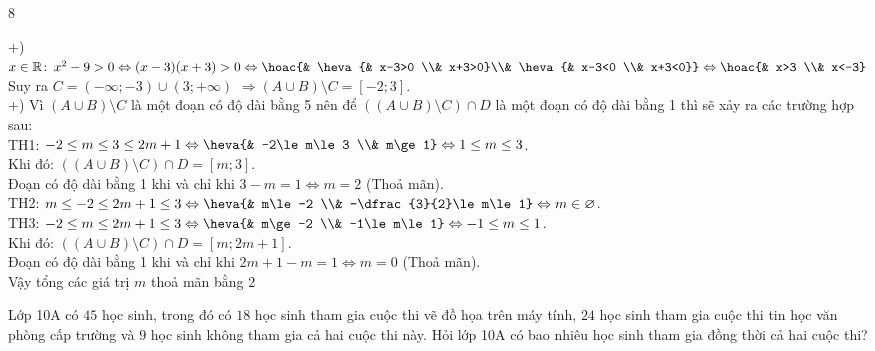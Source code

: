 \begin{indapan}{8}
\begin{bt}
{		+) $x\in \mathbb{R}\colon \,x^2-9>0\Leftrightarrow (x-3)(x+3)>0\Leftrightarrow \hoac{& \heva{& x-3>0 \\& x+3>0}\\& \heva{& x-3<0 \\& x+3<0}} \Leftrightarrow \hoac{& x>3 \\& x<-3}$\\
		Suy ra $C=\left(-\infty ;-3\right)\cup \left(3;+\infty\right)$ $\Rightarrow \left(A\cup B\right)\setminus C=\left[-2;3\right]$.\\
		+) Vì $\left(A\cup B\right)\setminus C$ là một đoạn có độ dài bằng 5 nên để $\left(\left(A\cup B\right)\setminus C\right)\cap D$ là một đoạn có độ dài bằng 1 thì sẽ xảy ra các trường hợp sau:\\
		TH1: $-2\le m\le 3\le 2m+1\Leftrightarrow \heva{& -2\le m\le 3 \\& m\ge 1}\Leftrightarrow 1\le m\le 3$.\\
		Khi đó: $\left(\left(A\cup B\right)\setminus C\right)\cap D=\left[m;3\right]$.\\
		Đoạn có độ dài bằng 1 khi và chỉ khi $3-m=1\Leftrightarrow m=2$ (Thoả mãn).\\
		TH2: $m\le -2\le 2m+1\le 3\Leftrightarrow \heva{& m\le -2 \\& -\dfrac{3}{2}\le m\le 1}\Leftrightarrow m\in \varnothing $.\\
		TH3: $-2\le m\le 2m+1\le 3\Leftrightarrow \heva{& m\ge -2 \\& -1\le m\le 1}\Leftrightarrow -1\le m\le 1$.\\
		Khi đó: $\left(\left(A\cup B\right)\setminus C\right)\cap D=\left[m;2m+1\right]$.\\
		Đoạn có độ dài bằng 1 khi và chỉ khi $2m+1-m=1\Leftrightarrow m=0$ (Thoả mãn).\\
		Vậy tổng các giá trị $m$ thoả mãn bằng 2
	}
\end{bt}
% 
\begin{bt}%
Lớp 10A có $45$ học sinh, trong đó có $18$ học sinh tham gia cuộc thi vẽ đồ họa trên máy tính, $24$ học sinh tham gia cuộc thi tin học văn phòng cấp trường và $9$ học sinh không tham gia cả hai cuộc thi này. Hỏi lớp 10A có bao nhiêu học sinh tham gia đồng thời cả hai cuộc thi?	
\end{bt}
\end{indapan}
